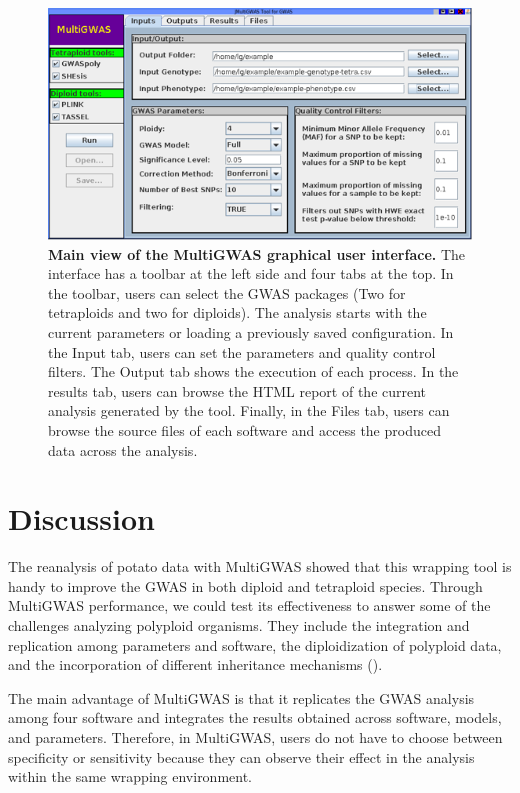 \documentclass{article}
\begin{document}
\begin{figure}[H]
\begin{centering}
\includegraphics[scale=0.5]{10_figure-implementation-jmultiGWAS}
\par\end{centering}
\caption{\textbf{Main view of the MultiGWAS graphical user interface.}  The interface has a toolbar at the left side and four tabs at the top. In the toolbar, users can select the GWAS packages (Two for tetraploids and two for diploids). The analysis starts with the current parameters or loading a previously saved configuration. In the Input tab, users can set the parameters and quality control filters. The Output tab shows the execution of each process. In the results tab, users can browse the HTML report of the current analysis generated by the tool. Finally, in the Files tab, users can browse the source files of each software and access the produced data across the analysis.}\label{fig:MultiGWAS-interaction} 
\end{figure}

\section{Discussion}

The reanalysis of potato data with MultiGWAS showed that this wrapping tool is handy to improve the GWAS in both diploid and tetraploid species. Through MultiGWAS performance, we could test its effectiveness to answer some of the challenges analyzing polyploid organisms. They include the integration and replication among parameters and software, the diploidization of polyploid data, and the incorporation of different inheritance mechanisms (\cite{dufresne2014}). 

The main advantage of MultiGWAS is that it replicates the GWAS analysis among four software and integrates the results obtained across software, models, and parameters. Therefore, in MultiGWAS, users do not have to choose between specificity or sensitivity because they can observe their effect in the analysis within the same wrapping environment.  
\end{document}
